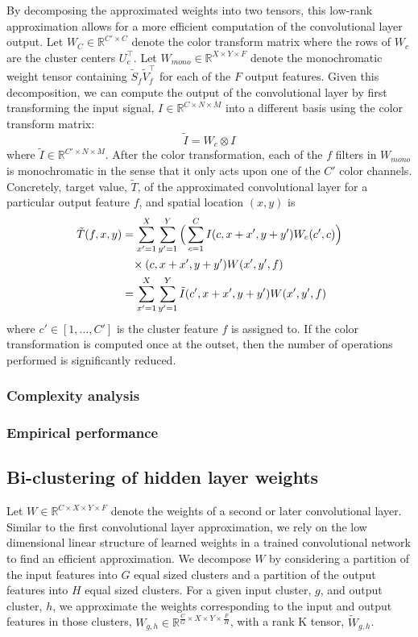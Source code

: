 By decomposing the approximated weights into two tensors, this low-rank approximation allows for a more efficient computation of the convolutional layer output. Let $W_C \in \mathbb{R}^{C' \times C}$ denote the color transform matrix where the rows of $W_c$ are the cluster centers $U_c^{\top}$. Let $W_{mono} \in \mathbb{R}^{X \times Y \times F}$ denote the monochromatic weight tensor containing $ \tilde{S}_f \tilde{V}_f^{\top}$ for each of the $F$ output features. Given this decomposition, we can compute the output of the convolutional layer by first transforming the input signal, $I \in \mathbb{R}^{C \times N \times M}$ into a different basis using the color transform matrix: 
\begin{equation*}
	\tilde{I} = W_c \otimes I
\end{equation*}
where $\tilde{I} \in \mathbb{R}^{C' \times N \times M}$. After the color transformation, each of the $f$ filters in $W_{mono}$ is monochromatic in the sense that it only acts upon one of the $C'$ color channels. Concretely, target value, $\tilde{T}$, of the approximated convolutional layer for a particular output feature $f$, and spatial location $(x, y)$ is
\begin{align*}
	\tilde{T}(f, x, y) &= \sum_{x' = 1}^{X} \sum_{y' = 1}^{Y} \Big(\sum_{c = 1}^{C} I(c, x + x', y + y') W_c(c', c) \Big) \\
			&\hspace{3mm} \times (c, x + x', y + y') W(x', y', f) \\
			&= \sum_{x' = 1}^{X} \sum_{y' = 1}^{Y} \tilde{I}(c', x + x', y + y') W(x', y', f)
\end{align*} 
where $c' \in [1, ..., C']$ is the cluster feature $f$ is assigned to. If the color transformation is computed once at the outset, then the number of operations performed is significantly reduced.  

\subsubsection{Complexity analysis}

\subsubsection{Empirical performance}

\subsection{Bi-clustering of hidden layer weights}
Let $W \in \mathbb{R}^{C \times X \times Y \times F}$ denote the weights of a second or later convolutional layer. Similar to the first convolutional layer approximation, we rely on the low dimensional linear structure of learned weights in a trained convolutional network to find an efficient approximation. We decompose $W$ by considering a partition of the input features into $G$ equal sized clusters and a partition of the output features into $H$ equal sized clusters. For a given input cluster, $g$, and output cluster, $h$, we approximate the weights corresponding to the input and output features in those clusters, $W_{g,h} \in \mathbb{R}^{\frac{C}{G} \times X \times Y \times \frac{F}{H}}$, with a rank K tensor, $\tilde{W}_{g,h}$.  

